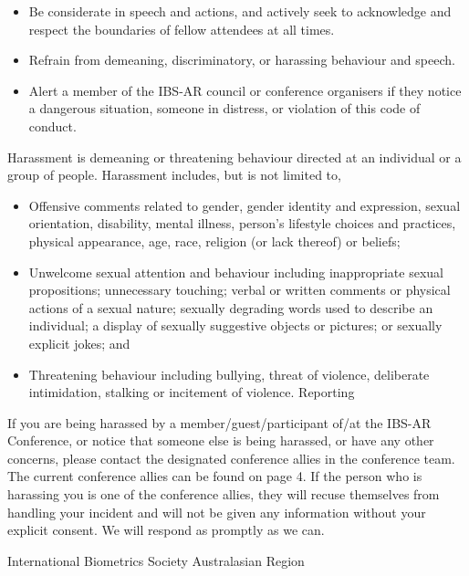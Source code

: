 \documentclass[
]{scrreprt}
\providecommand{\tightlist}{%
  \setlength{\itemsep}{0pt}\setlength{\parskip}{0pt}}\usepackage{longtable,booktabs,array}
\begin{document}
\begin{itemize}
\tightlist
\item
  Be considerate in speech and actions, and actively seek to acknowledge
  and respect the boundaries of fellow attendees at all times.
\item
  Refrain from demeaning, discriminatory, or harassing behaviour and
  speech.
\item
  Alert a member of the IBS-AR council or conference organisers if they
  notice a dangerous situation, someone in distress, or violation of
  this code of conduct.
\end{itemize}

Harassment is demeaning or threatening behaviour directed at an
individual or a group of people. Harassment includes, but is not limited
to,

\begin{itemize}
\tightlist
\item
  Offensive comments related to gender, gender identity and expression,
  sexual orientation, disability, mental illness, person's lifestyle
  choices and practices, physical appearance, age, race, religion (or
  lack thereof) or beliefs;
\item
  Unwelcome sexual attention and behaviour including inappropriate
  sexual propositions; unnecessary touching; verbal or written comments
  or physical actions of a sexual nature; sexually degrading words used
  to describe an individual; a display of sexually suggestive objects or
  pictures; or sexually explicit jokes; and
\item
  Threatening behaviour including bullying, threat of violence,
  deliberate intimidation, stalking or incitement of violence. Reporting
\end{itemize}

If you are being harassed by a member/guest/participant of/at the IBS-AR
Conference, or notice that someone else is being harassed, or have any
other concerns, please contact the designated conference allies in the
conference team. The current conference allies can be found on page 4.
If the person who is harassing you is one of the conference allies, they
will recuse themselves from handling your incident and will not be given
any information without your explicit consent. We will respond as
promptly as we can.



\printindex


\cleardoublepage
\newpage

\pagestyle{empty}



\centering



International Biometrics Society Australasian Region
\end{document}
